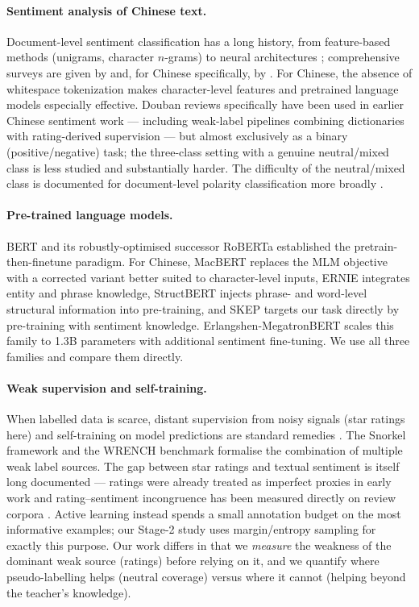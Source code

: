 \documentclass[11pt,a4paper]{article}
\begin{document}
\paragraph{Sentiment analysis of Chinese text.}
Document-level sentiment classification has a long history, from
feature-based methods (unigrams, character $n$-grams) to neural
architectures \citep{kim2014,socher2013,joulin2017,reimers2019};
comprehensive surveys are given by \citet{pang2008} and, for Chinese
specifically, by \citet{tan2008}. For Chinese, the absence of
whitespace tokenization makes character-level features and pretrained
language models especially effective. Douban reviews specifically have
been used in earlier Chinese sentiment work --- including weak-label
pipelines combining dictionaries with rating-derived supervision
\citep{fan2018} --- but almost exclusively as
a binary (positive/negative) task; the three-class setting with a
genuine neutral/mixed class is less studied and substantially harder.
The difficulty of the neutral/mixed class is documented for
document-level polarity classification more broadly
\citep{martins2021}.

\paragraph{Pre-trained language models.}
BERT \citep{devlin2019} and its robustly-optimised successor RoBERTa
\citep{liu2019} established the pretrain-then-finetune paradigm. For
Chinese, MacBERT \citep{cui2020} replaces the MLM objective with a
corrected variant better suited to character-level inputs, ERNIE
\citep{sun2019} integrates entity and phrase knowledge, StructBERT
\citep{wang2020} injects phrase- and word-level structural
information into pre-training, and SKEP \citep{tian2020} targets our
task directly by pre-training with sentiment knowledge.
Erlangshen-MegatronBERT
\citep{idea2023} scales this family to 1.3B parameters with additional
sentiment fine-tuning. We use all three families and compare
them directly.

\paragraph{Weak supervision and self-training.}
When labelled data is scarce, distant supervision from noisy signals
(star ratings here) and self-training on model predictions are standard
remedies \citep{yarowsky1995,lee2013}. The Snorkel framework
\citep{ratner2017} and the WRENCH benchmark \citep{zhang2021wrench}
formalise the combination of multiple weak label
sources. The gap between star ratings and textual sentiment is itself
long documented --- ratings were already treated as imperfect proxies
in early work \citep{pang2005seeing} and rating--sentiment
incongruence has been measured directly on review corpora
\citep{abaiyan2026stars}. Active learning \citep{settles2009} instead spends a small
annotation budget on the most informative examples; our Stage-2 study
uses margin/entropy sampling for exactly this purpose. Our work
differs in that we \emph{measure} the weakness of the
dominant weak source (ratings) before relying on it, and we quantify
where pseudo-labelling helps (neutral coverage) versus where it cannot
(helping beyond the teacher's knowledge).
\end{document}

